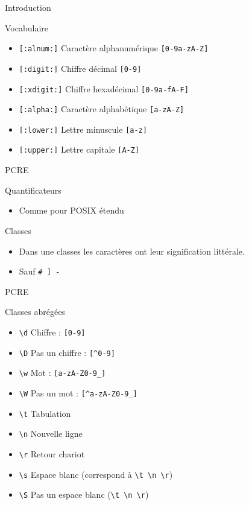 \def\ftitle{Introduction}
\begin{frame}[containsverbatim]{\ftitle}
\def\blocktitle{Vocabulaire}
\begin{block}{\blocktitle}
\begin{itemize}
\item \verb![:alnum:]! 	Caractère alphanumérique 	\verb![0-9a-zA-Z]!
\item \verb![:digit:]! 	Chiffre décimal 	\verb![0-9]!
\item \verb![:xdigit:]! 	Chiffre hexadécimal 	\verb![0-9a-fA-F]!
\item \verb![:alpha:]! 	Caractère alphabétique 	\verb![a-zA-Z]!
\item \verb![:lower:]! 	Lettre minuscule 	\verb![a-z]!
\item \verb![:upper:]! 	Lettre capitale 	\verb![A-Z]!
\end{itemize}
\end{block}
\end{frame}

\def\ftitle{PCRE}
\begin{frame}[containsverbatim]{\ftitle}
\def\blocktitle{Quantificateurs}
\begin{block}{\blocktitle}
\begin{itemize}
\item Comme pour POSIX étendu
\end{itemize}
\end{block}

\def\blocktitle{Classes}
\begin{block}{\blocktitle}
\begin{itemize}
\item Dans une classes les caractères ont leur signification littérale.
\item Sauf \verb!# ] -!
\end{itemize}
\end{block}
\end{frame}


\begin{frame}[containsverbatim]{\ftitle}
\def\blocktitle{Classes abrégées}
\begin{block}{\blocktitle}
\begin{itemize}
\item \verb!\d! 	Chiffre : \verb![0-9]!
\item \verb!\D! 	Pas un chiffre : \verb![^0-9]!
\item \verb!\w! 	Mot : \verb![a-zA-Z0-9_]!
\item \verb!\W! 	Pas un mot : \verb![^a-zA-Z0-9_]!
\item \verb!\t! 	Tabulation
\item \verb!\n! 	Nouvelle ligne
\item \verb!\r! 	Retour chariot
\item \verb!\s! 	Espace blanc (correspond à \verb!\t \n \r!)
\item \verb!\S! 	Pas un espace blanc (\verb!\t \n \r!)
\end{itemize}
\end{block}
\end{frame}


